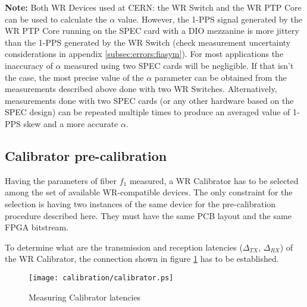 {\bf Note:} Both WR Devices used at CERN: the WR Switch and the WR PTP Core can
be used to calculate the $\alpha$ value. However, the 1-PPS signal generated by
the WR PTP Core running on the SPEC card with a DIO mezzanine is more jittery
than the 1-PPS generated by the WR Switch (check measurement uncertainty
considerations in appendix \ref{subsec:errors:fiasym}). For most applications
the inaccuracy of $\alpha$ measured using two SPEC cards will be negligible. If
that isn't the case, the most precise value of the $\alpha$ parameter can be
obtained from the measurements described above done with two WR Switches.
Alternatively, measurements done with two SPEC cards (or any other hardware
based on the SPEC design) can be repeated multiple times to produce an averaged
value of 1-PPS skew and a more accurate $\alpha$.


\subsection{Calibrator pre-calibration}
\label{sec:procedure:calibrator}

Having the parameters of fiber $f_1$ measured, a WR Calibrator has to be
selected among the set of available WR-compatible devices. The only
constraint for the selection is having two instances of the same device
for the pre-calibration procedure described here. They must have the
same PCB layout and the same FPGA bitstream.

To determine what are the transmission and reception latencies ($\Delta_{TX}$,
$\Delta_{RX}$) of the WR Calibrator, the connection shown in figure
\ref{fig:calibrator} has to be established.

\begin{figure}[ht]
	\begin{center}
		\texttt{[image: calibration/calibrator.ps]}
		\caption{Measuring Calibrator latencies}
		\label{fig:calibrator}
	\end{center}
\end{figure}

